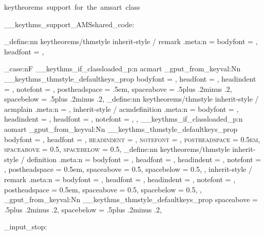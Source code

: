   {keytheorems~support~for~the~amsart~class}

\__keythms_support_AMSshared_code:

\keys_define:nn { keytheorems/thmstyle }
  {
    inherit-style / remark .meta:n =
      {
        bodyfont = \normalfont,
        headfont = \itshape,
      }
  }

\bool_case:nF
  {
    { \__keythms_if_classloaded_p:n { acmart } }
      {
        \prop_gput_from_keyval:Nn \g__keythms_thmstyle_defaultkeys_prop
          {
            bodyfont      = \@acmplainbodyfont,
            headfont      = \@acmplainheadfont,
            headindent    = \@acmplainindent,
            notefont      = \@acmplainnotefont,
            postheadspace = .5em,
            spaceabove    =
              .5\baselineskip plus .2\baselineskip minus .2\baselineskip,
            spacebelow    =
              .5\baselineskip plus .2\baselineskip minus .2\baselineskip,
          }
        \keys_define:nn { keytheorems/thmstyle }
          {
            inherit-style / acmplain      .meta:n = {},
            inherit-style / acmdefinition .meta:n =
              {
                bodyfont   = \@acmdefinitionbodyfont,
                headindent = \@acmdefinitionindent,
                headfont   = \@acmdefinitionheadfont,
                notefont   = \@acmdefinitionnotefont,
              },
          }
      }
    { \__keythms_if_classloaded_p:n { aomart } }
      {
        \prop_gput_from_keyval:Nn \g__keythms_thmstyle_defaultkeys_prop
          {
            bodyfont      = \sishape,
            headfont      = \scshape,
            headindent    = \parindent,
            notefont      = \normalfont,
            postheadspace = 0.5em,
            spaceabove    = 0.5\linespacing,
            spacebelow    = 0.5\linespacing,
          }
        \keys_define:nn { keytheorems/thmstyle }
          {
            inherit-style / definition .meta:n =
              {
                bodyfont      = \upshape,
                headfont      = \sishape,
                headindent    = \parindent,
                notefont      = \normalfont,
                postheadspace = 0.5em,
                spaceabove    = 0.5\linespacing,
                spacebelow    = 0.5\linespacing,
              },
            inherit-style / remark .meta:n =
              {
                bodyfont      = \upshape,
                headfont      = \sishape,
                headindent    = \parindent,
                notefont      = \normalfont,
                postheadspace = 0.5em,
                spaceabove    = 0.5\linespacing,
                spacebelow    = 0.5\linespacing,
              },
          }
      }
  }
  { %
    \prop_gput_from_keyval:Nn \g__keythms_thmstyle_defaultkeys_prop
      {
        spaceabove = .5\baselineskip plus .2\baselineskip minus .2\baselineskip,
        spacebelow = .5\baselineskip plus .2\baselineskip minus .2\baselineskip,
      }
  }

\file_input_stop: